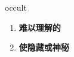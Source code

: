 
\begin{frame}
{\huge occult}
\begin{center}
\begin{enumerate}\Large
  \item \textbf{难以理解的}
  \item \textbf{使隐藏或神秘}
\end{enumerate}
\end{center}
\end{frame}
